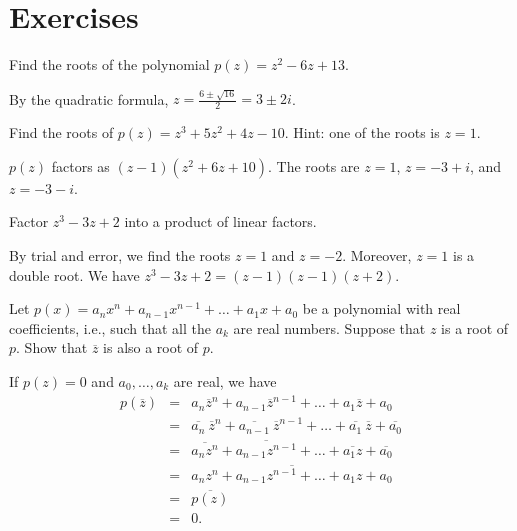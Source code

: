 \section*{Exercises}


\begin{ex}
  Find the roots of the polynomial $p(z) = z^2-6z+13$.
  \begin{sol}
    By the quadratic formula, $\displaystyle z=\frac{6\pm\sqrt{16}}{2}
      = 3\pm 2i$.    
  \end{sol}
\end{ex}

\begin{ex}
  Find the roots of $p(z) = z^3 + 5z^2 + 4z - 10$. Hint: one of the
  roots is $z=1$.
  \begin{sol}
    $p(z)$ factors as $(z-1)(z^2+6z+10)$. The roots are $z=1$,
    $z=-3+i$, and $z=-3-i$.
  \end{sol}
\end{ex}

\begin{ex}
  Factor $z^3 - 3z + 2$ into a product of linear factors.
  \begin{sol}
    By trial and error, we find the roots $z=1$ and $z=-2$. Moreover,
    $z=1$ is a double root. We have $z^3 - 3z + 2 = (z-1)(z-1)(z+2)$.
  \end{sol}
\end{ex}

\begin{ex}
  Let $p(x) =a_{n}x^{n}+a_{n-1}x^{n-1}+\ldots+a_{1}x+a_{0}$ be a
  polynomial with real coefficients, i.e., such that all the $a_{k}$
  are real numbers. Suppose that $z$ is a root of $p$. Show that
  $\overline{z}$ is also a root of $p$. 
  \begin{sol}
    If $p(z) =0$ and $a_0,\ldots,a_k$ are real, we have
    \begin{eqnarray*}
      p(\overline{z})
      &=& a_{n}\overline{z}^{n}+a_{n-1}\overline{z}^{n-1}+\ldots +a_{1}\overline{z}          
          +a_{0} \\
      &=&\overline{a_{n}}\ \overline{z}^{n}+\overline{a_{n-1}}\ \overline{z}                
      ^{n-1}+\ldots +\overline{a_{1}}\ \overline{z}+\overline{a_{0}}
      \\
      &=& \overline{a_{n}z^{n}}+\overline{a_{n-1}z^{n-1}}+\ldots +\overline{a_{1}z}+         
          \overline{a_{0}} \\
      &=& \overline{a_{n}z^{n}+a_{n-1}z^{n-1}+\ldots+a_{1}z+a_{0}} \\
      &=& \overline{p(z) } \\
      &=& 0.
    \end{eqnarray*}
  \end{sol}
\end{ex}

